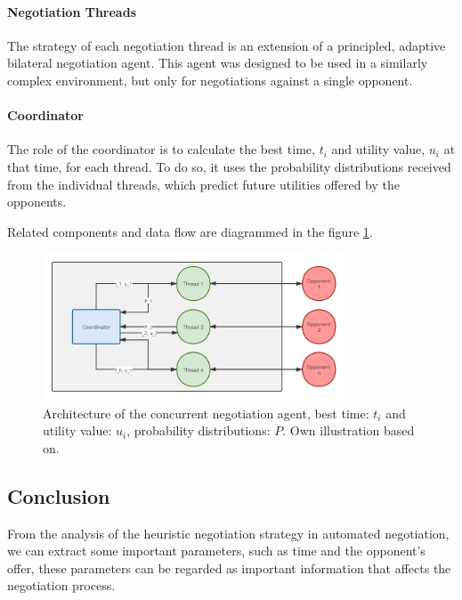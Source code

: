 \paragraph{Negotiation Threads} The strategy of each negotiation thread is an extension of a principled, adaptive bilateral negotiation agent. This agent was designed to be used in a similarly complex environment, but only for negotiations against a single opponent.

\paragraph{Coordinator} The role of the coordinator is to calculate the best time, $t_i$ and utility value, $u_i$ at that time, for each thread. To do so, it uses the probability distributions received from the individual threads, which predict future utilities offered by the opponents.

Related components and data flow are diagrammed in the figure \ref{fig:heuristic-concurrent-negotiation}.
\begin{figure}[htbp]
\centering
\includegraphics[width=0.8\textwidth]{./images/heuristic_concurrent_negotiation.png}
\caption{Architecture of the concurrent negotiation agent, best time: $t_i$ and utility value: $u_i$, probability distributions: $P$. Own illustration based on\parencite{Williams12Concurrent}.}
\label{fig:heuristic-concurrent-negotiation}
\end{figure}

\subsection{Conclusion}
From the analysis of the heuristic negotiation strategy in automated negotiation, we can extract some important parameters, such as time and the opponent's offer, these parameters can be regarded as important information that affects the negotiation process.

